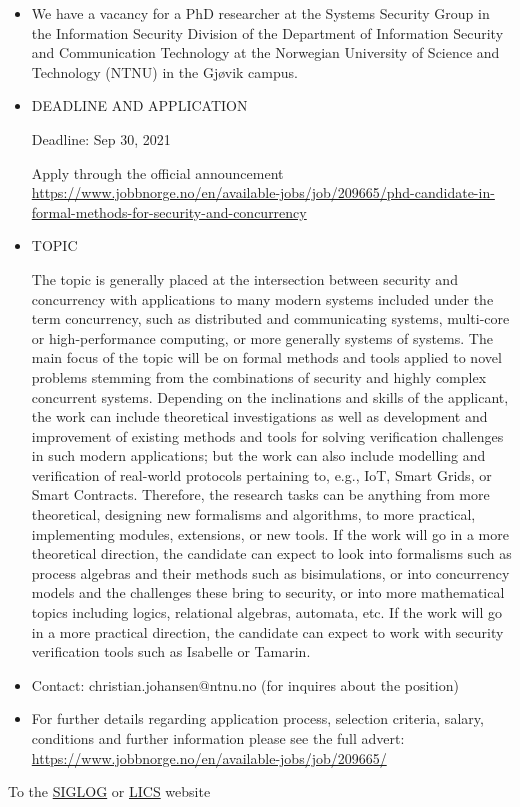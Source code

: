 \documentclass[prodmode,acmtecs]{acmsmall} %
\begin{document}
\begin{itemize}\item  We have a vacancy for a PhD researcher at the Systems Security Group in the Information Security Division of the Department of Information Security and Communication Technology at the Norwegian University of Science and Technology (NTNU) in the Gjøvik campus. 
 
\item  DEADLINE AND APPLICATION 
 
Deadline: Sep 30, 2021 
 
  Apply through the official announcement \href{https://www.jobbnorge.no/en/available-jobs/job/209665/phd-candidate-in-formal-methods-for-security-and-concurrency}{https://www.jobbnorge.no/en/available-jobs/job/209665/phd-candidate-in-formal-methods-for-security-and-concurrency}  
 
\item  TOPIC 
 
  The topic is generally placed at the intersection between security and concurrency with applications to many modern systems included under the term concurrency, such as distributed and communicating systems, multi-core or high-performance computing, or more generally systems of systems. The main focus of the topic will be on formal methods and tools applied to novel problems stemming from the combinations of security and highly complex concurrent systems. Depending on the inclinations and skills of the applicant, the work can include theoretical investigations as well as development and improvement of existing methods and tools for solving verification challenges in such modern applications; but the work can also include modelling and verification of real-world protocols pertaining to, e.g., IoT, Smart Grids, or Smart Contracts. Therefore, the research tasks can be anything from more theoretical, designing new formalisms and algorithms, to more practical, implementing modules, extensions, or new tools. If the work will go in a more theoretical direction, the candidate can expect to look into formalisms such as process algebras and their methods such as bisimulations, or into concurrency models and the challenges these bring to security, or into more mathematical topics including logics, relational algebras, automata, etc. If the work will go in a more practical direction, the candidate can expect to work with security verification tools such as Isabelle or Tamarin. 
 
\item  Contact: christian.johansen@ntnu.no  (for inquires about the position)  
 
\item  For further details regarding application process, selection criteria, salary, conditions and further information please see the full advert: \href{https://www.jobbnorge.no/en/available-jobs/job/209665/}{https://www.jobbnorge.no/en/available-jobs/job/209665/} 
 
\end{itemize}


To the \href{http://siglog.org/}{SIGLOG} or \href{https://lics.siglog.org}{LICS} website
\end{document}
